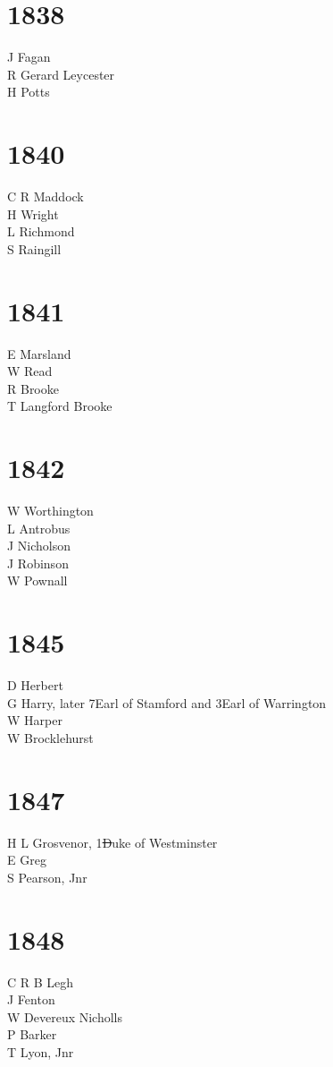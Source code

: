 \begin{multicols}{2}
  \section*{1838}
  J Fagan \\
  R Gerard Leycester \\
  H Potts \\
  \section*{1840}
  C R Maddock \\
  H Wright \\
  L Richmond \\
  S Raingill \\
  \section*{1841}
  E Marsland \\
  W Read \\
  R Brooke \\
  T Langford Brooke \\
  \section*{1842}
  W Worthington \\
  L Antrobus \\
  J Nicholson \\
  J Robinson \\
  W Pownall \\
  \section*{1845}
  D Herbert \\
  G Harry, later 7\nth Earl of Stamford and 3\rd Earl of Warrington \\
  W Harper \\
  W Brocklehurst \\
  \section*{1847}
  H L Grosvenor, 1\st Duke of Westminster \\
  E Greg \\
  S Pearson, Jnr \\
  \section*{1848}
  C R B Legh \\
  J Fenton \\
  W Devereux Nicholls \\
  P Barker \\
  T Lyon, Jnr \\

\end{multicols}

